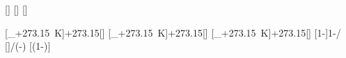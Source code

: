 [\degreeCelsius]
[\degreeCelsius]
[\degreeCelsius]

[\vartheta_+\SI{273.15}{\kelvin}]{\tofX+273.15}[\kelvin]
[\vartheta_+\SI{273.15}{\kelvin}]{\taX+273.15}[\kelvin]
[\vartheta_+\SI{273.15}{\kelvin}]{\tiX+273.15}[\kelvin]
[1-]{1-\TaX/\ToX}
[]{\TiX/(\TiX-\TaX)}
[\left(1-\right)]{\etSX*\ewpX}
